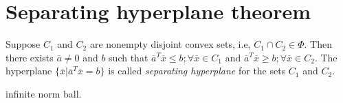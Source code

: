 \documentclass{tufte-handout}
\theoremstyle{remark}
\begin{document}



%
%

\section{Separating hyperplane theorem}
Suppose $C_1$ and $C_2$ are nonempty disjoint convex sets, i.e, $C_1 \cap C_2 \in \Phi$. Then there exists $\overline{a} \neq 0$ and $b$ such that $\overline{a}^T\overline{x} \le b; \forall \overline{x} \in C_1$ and $\overline{a}^T\overline{x} \ge b; \forall \overline{x} \in C_2$. The hyperplane $\{\overline{x} | \overline{a}^T\overline{x} = b\}$ is called \textit{separating hyperplane} for the sets $C_1$ and $C_2$.
\begin{marginfigure}
\caption{infinite norm ball.}
\end{marginfigure}
\end{document}
